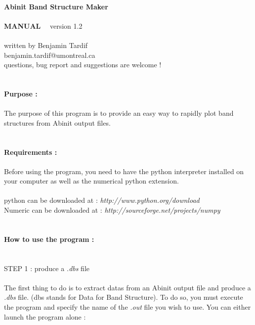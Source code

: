 \documentclass[prl]{article}
\begin{document}
\
\\
{\huge\textbf{Abinit Band Structure Maker \\ \\ MANUAL}} \ \ version 1.2 \\
\\
written by Benjamin Tardif \\
benjamin.tardif@umontreal.ca \\
questions, bug report and suggestions are welcome ! \\
\\
\\
{\Large\textbf{Purpose :}} \\
\\
The purpose of this program is to provide an easy way to rapidly plot band structures from Abinit output files. \\
\\
\\
{\Large\textbf{Requirements :}} \\
\\
Before using the program, you need to have the python interpreter installed on your computer as well as the numerical python extension. \\
\\
python can be downloaded at : \textit{http://www.python.org/download} \\
Numeric can be downloaded at : \textit{http://sourceforge.net/projects/numpy} \\
\\
\\
{\Large\textbf{How to use the program :}} \\
\\
\\
{\large{STEP 1 : produce a \textit{.dbs} file}} \\
\\
The first thing to do is to extract datas from an Abinit output file and produce a \textit{.dbs} file. (dbs stands for Data for Band Structure).
To do so, you must execute the program and specify the name of the \textit{.out} file you wish to use. You can either launch the program alone : \\
\end{document}
